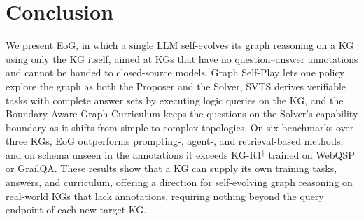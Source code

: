 \section{Conclusion}
\label{sec:conclusion}

We present EoG, in which a single LLM self-evolves its graph reasoning on a KG using only the KG itself, aimed at KGs that have no question--answer annotations and cannot be handed to closed-source models. Graph Self-Play lets one policy explore the graph as both the Proposer and the Solver, SVTS derives verifiable tasks with complete answer sets by executing logic queries on the KG, and the Boundary-Aware Graph Curriculum keeps the questions on the Solver's capability boundary as it shifts from simple to complex topologies. On six benchmarks over three KGs, EoG outperforms prompting-, agent-, and retrieval-based methods, and on schema unseen in the annotations it exceeds KG-R1$^\dagger$ trained on WebQSP or GrailQA. These results show that a KG can supply its own training tasks, answers, and curriculum, offering a direction for self-evolving graph reasoning on real-world KGs that lack annotations, requiring nothing beyond the query endpoint of each new target KG.

